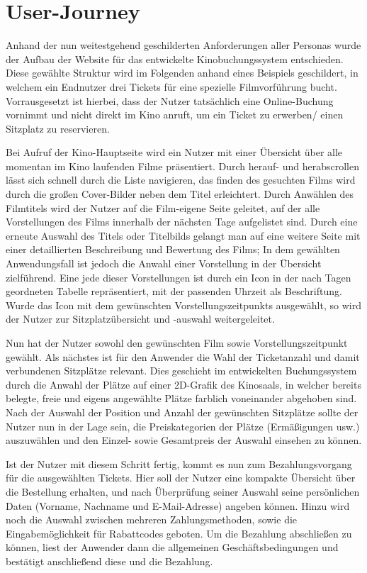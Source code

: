 \section{User-Journey}

Anhand der nun weitestgehend geschilderten Anforderungen aller Personas wurde der Aufbau der Website für das entwickelte Kinobuchungssystem entschieden.
Diese gewählte Struktur wird im Folgenden anhand eines Beispiels geschildert, in welchem ein Endnutzer drei Tickets für eine spezielle Filmvorführung bucht.
Vorrausgesetzt ist hierbei, dass der Nutzer tatsächlich eine Online-Buchung vornimmt und nicht direkt im Kino anruft, um ein Ticket zu erwerben/ einen Sitzplatz zu reservieren.

Bei Aufruf der Kino-Hauptseite wird ein Nutzer mit einer Übersicht über alle momentan im Kino laufenden Filme präsentiert. Durch herauf- und herabscrollen lässt sich schnell durch die Liste navigieren, das finden des gesuchten Films wird durch die großen Cover-Bilder neben dem Titel erleichtert. Durch Anwählen des Filmtitels wird der Nutzer auf die Film-eigene Seite geleitet, auf der alle Vorstellungen des Films innerhalb der nächsten Tage aufgelistet sind. Durch eine erneute Auswahl des Titels oder Titelbilds gelangt man auf eine weitere Seite mit einer detaillierten Beschreibung und Bewertung des Films; In dem gewählten Anwendungsfall ist jedoch die Anwahl einer Vorstellung in der Übersicht zielführend. Eine jede dieser Vorstellungen ist durch ein Icon in der nach Tagen geordneten Tabelle repräsentiert, mit der passenden Uhrzeit als Beschriftung. Wurde das Icon mit dem gewünschten Vorstellungszeitpunkts ausgewählt, so wird der Nutzer zur Sitzplatzübersicht und -auswahl weitergeleitet.

Nun hat der Nutzer sowohl den gewünschten Film sowie Vorstellungszeitpunkt gewählt. Als nächstes ist für den Anwender die Wahl der Ticketanzahl und damit verbundenen Sitzplätze relevant. Dies geschieht im entwickelten Buchungssystem durch die Anwahl der Plätze auf einer 2D-Grafik des Kinosaals, in welcher bereits belegte, freie und eigens angewählte Plätze farblich voneinander abgehoben sind. Nach der Auswahl der Position und Anzahl der gewünschten Sitzplätze sollte der Nutzer nun in der Lage sein, die Preiskategorien der Plätze (Ermäßigungen usw.) auszuwählen und den Einzel- sowie Gesamtpreis der Auswahl einsehen zu können.

Ist der Nutzer mit diesem Schritt fertig, kommt es nun zum Bezahlungsvorgang für die ausgewählten Tickets. Hier soll der Nutzer eine kompakte Übersicht über die Bestellung erhalten, und nach Überprüfung seiner Auswahl seine persönlichen Daten (Vorname, Nachname und E-Mail-Adresse) angeben können. Hinzu wird noch die Auswahl zwischen mehreren Zahlungsmethoden, sowie die Eingabemöglichkeit für Rabattcodes geboten. Um die Bezahlung abschließen zu können, liest der Anwender dann die allgemeinen Geschäftsbedingungen und bestätigt anschließend diese und die Bezahlung.

